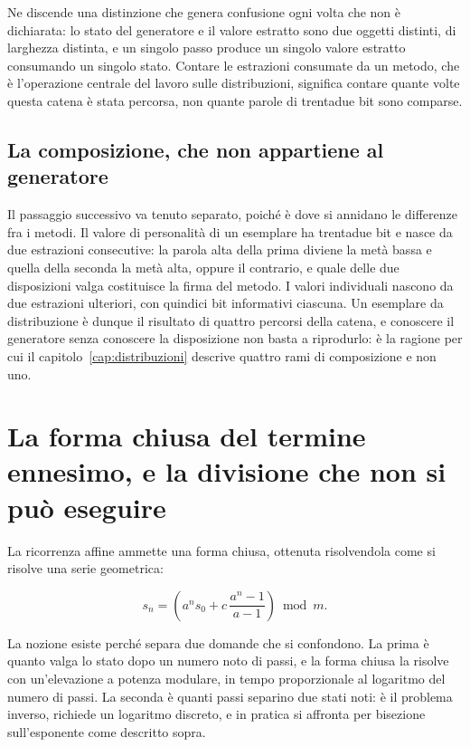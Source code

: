 Ne discende una distinzione che genera confusione ogni volta che non è dichiarata: lo stato del generatore e il valore estratto sono due oggetti distinti, di larghezza distinta, e un singolo passo produce un singolo valore estratto consumando un singolo stato. Contare le estrazioni consumate da un metodo, che è l'operazione centrale del lavoro sulle distribuzioni, significa contare quante volte questa catena è stata percorsa, non quante parole di trentadue bit sono comparse.

\subsection*{La composizione, che non appartiene al generatore}

Il passaggio successivo va tenuto separato, poiché è dove si annidano le differenze fra i metodi. Il valore di personalità di un esemplare ha trentadue bit e nasce da due estrazioni consecutive: la parola alta della prima diviene la metà bassa e quella della seconda la metà alta, oppure il contrario, e quale delle due disposizioni valga costituisce la firma del metodo. I valori individuali nascono da due estrazioni ulteriori, con quindici bit informativi ciascuna. Un esemplare da distribuzione è dunque il risultato di quattro percorsi della catena, e conoscere il generatore senza conoscere la disposizione non basta a riprodurlo: è la ragione per cui il capitolo~\ref{cap:distribuzioni} descrive quattro rami di composizione e non uno.

\section{La forma chiusa del termine ennesimo, e la divisione che non si può eseguire}

La ricorrenza affine ammette una forma chiusa, ottenuta risolvendola come si risolve una serie geometrica:

\begin{equation}
s_n = \left( a^n s_0 + c\,\frac{a^n - 1}{a - 1} \right) \bmod m .
\end{equation}

La nozione esiste perché separa due domande che si confondono. La prima è quanto valga lo stato dopo un numero noto di passi, e la forma chiusa la risolve con un'elevazione a potenza modulare, in tempo proporzionale al logaritmo del numero di passi. La seconda è quanti passi separino due stati noti: è il problema inverso, richiede un logaritmo discreto, e in pratica si affronta per bisezione sull'esponente come descritto sopra.


